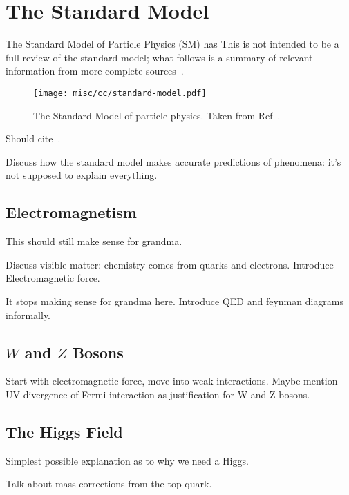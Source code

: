 \section{The Standard Model}
The Standard Model of Particle Physics (SM) has
This is not intended to be a full review of the standard model; what follows is a summary of relevant information from more complete sources~\cite{peskin}.
\begin{figure}
  \texttt{[image: misc/cc/standard-model.pdf]}
  \caption[The Standard Model of particle physics]{The Standard Model of particle physics. Taken from Ref~\cite{smwiki}.}
\end{figure}

Should cite~\cite{ewuv,ewgaugeinvariance,weakinthev}.

Discuss how the standard model makes accurate predictions of phenomena: it's not supposed to explain everything.
\subsection{Electromagnetism}

This should still make sense for grandma.

Discuss visible matter: chemistry comes from quarks and electrons. Introduce Electromagnetic force.

It stops making sense for grandma here. Introduce QED and feynman diagrams informally.

\subsection{$W$ and $Z$ Bosons}
Start with electromagnetic force, move into weak interactions. Maybe mention UV divergence of Fermi interaction as justification for W and Z bosons.
\subsection{The Higgs Field}
Simplest possible explanation as to why we need a Higgs.

Talk about mass corrections from the top quark.

